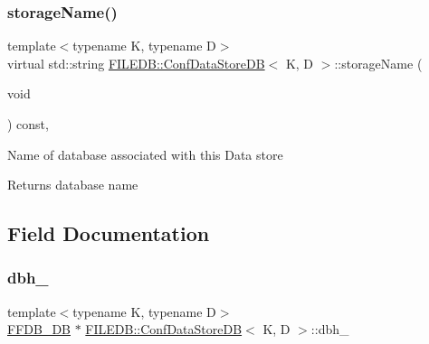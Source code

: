 \subsubsection{\texorpdfstring{storageName()}{storageName()}\hspace{0.1cm}{\footnotesize\ttfamily [2/2]}}
{\footnotesize\ttfamily template$<$typename K, typename D$>$ \\
virtual std\+::string \mbox{\hyperlink{classFILEDB_1_1ConfDataStoreDB}{F\+I\+L\+E\+D\+B\+::\+Conf\+Data\+Store\+DB}}$<$ K, D $>$\+::storage\+Name (\begin{DoxyParamCaption}\item[{void}]{ }\end{DoxyParamCaption}) const\hspace{0.3cm}{\ttfamily [inline]}, {\ttfamily [virtual]}}

Name of database associated with this Data store

\begin{DoxyReturn}{Returns}
database name 
\end{DoxyReturn}


\subsection{Field Documentation}
\mbox{\label{classFILEDB_1_1ConfDataStoreDB_aa5e755cd462b3df8b2fcc74c78e9d90b}} 
\subsubsection{\texorpdfstring{dbh\_}{dbh\_}}
{\footnotesize\ttfamily template$<$typename K, typename D$>$ \\
\mbox{\hyperlink{other__libs_2filedb_2filehash_2ffdb__db_8h_a0b27b956926453a7a8141ea8e10f0df8}{F\+F\+D\+B\+\_\+\+DB}} $\ast$ \mbox{\hyperlink{classFILEDB_1_1ConfDataStoreDB}{F\+I\+L\+E\+D\+B\+::\+Conf\+Data\+Store\+DB}}$<$ K, D $>$\+::dbh\+\_\+\hspace{0.3cm}{\ttfamily [protected]}}

\mbox{\label{classFILEDB_1_1ConfDataStoreDB_a05dc0142a79f69fdc6dfa3cf50beea15}} 
